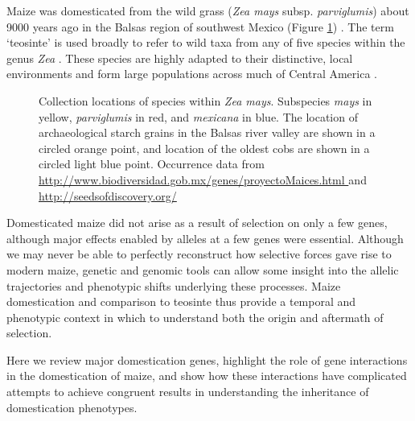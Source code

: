 \documentclass[a4paper]{article}
\begin{document}
﻿Maize was domesticated from the wild grass (\textit{Zea mays} subsp. \textit{parviglumis}) about 9000 years ago in the Balsas region of southwest Mexico (Figure \ref{fig:map}) \citep{matsuoka2002, piperno2009}.
The term `teosinte' is used broadly to refer to wild taxa from any of five species within the genus \textit{Zea} \citep{doebley1980, iltis1980}.
These species are highly adapted to their distinctive, local environments \citep{hufford2012maxent, hufford2012review} and form large populations across much of Central America \citep{wilkes1967}.


   \begin{figure}
        \caption{\label{fig:map} Collection locations of species within \textit{Zea mays}. Subspecies \textit{mays} in yellow, \textit{parviglumis} in red, and \textit{mexicana} in blue. The location of archaeological starch grains \citep{piperno2009} in the Balsas river valley are shown in a circled orange point, and location of the oldest cobs \citep{benz2001} are shown in a circled light blue point. Occurrence data from \url{http://www.biodiversidad.gob.mx/genes/proyectoMaices.html
} and \url{http://seedsofdiscovery.org/}}
\end{figure}


﻿Domesticated maize did not arise as a result of selection on only a few genes, although major effects enabled by alleles at a few genes were essential.
Although we may never be able to perfectly reconstruct how selective forces gave rise to modern maize, genetic and genomic tools can allow some insight into the allelic trajectories and phenotypic shifts underlying these processes.
Maize domestication and comparison to teosinte thus provide a temporal and phenotypic context in which to understand both the origin and aftermath of selection.

﻿Here we review major domestication genes, highlight the role of gene interactions in the domestication of maize, and show how these interactions have complicated attempts to achieve congruent results in understanding the inheritance of domestication phenotypes.
\end{document}
